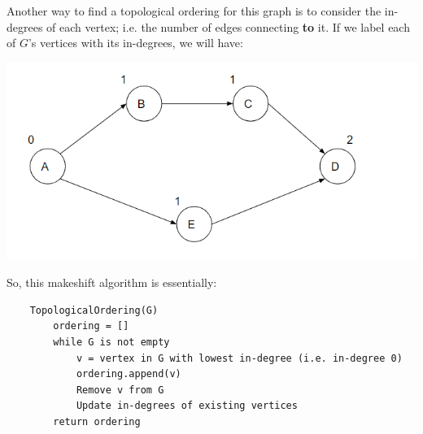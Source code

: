 \documentclass[letterpaper]{article}
\begin{document}
Another way to find a topological ordering for this graph is to consider the in-degrees of each vertex; i.e. the number of edges connecting \textbf{to} it. If we label each of $G$'s vertices with its in-degrees, we will have: 
\begin{center}
    \includegraphics[scale=0.7]{../assets/dag_ex_deg_1.png}
\end{center}
So, this makeshift algorithm is essentially:
\begin{verbatim}
    TopologicalOrdering(G)
        ordering = []
        while G is not empty
            v = vertex in G with lowest in-degree (i.e. in-degree 0)
            ordering.append(v)
            Remove v from G
            Update in-degrees of existing vertices
        return ordering  
\end{verbatim}
\end{document}
